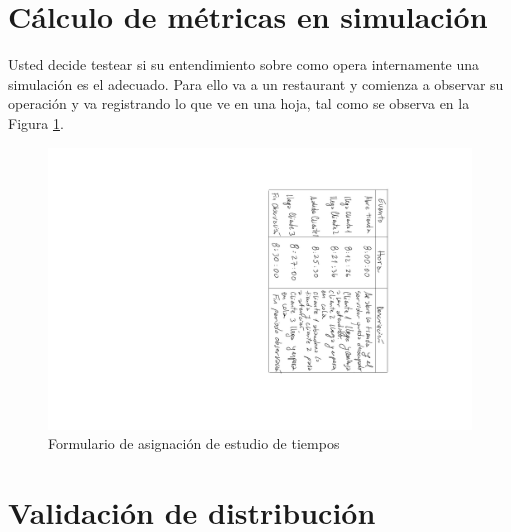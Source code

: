 \documentclass[11pt]{exam}
\begin{document}
\begin{questions}
\section*{C\'alculo de m\'etricas en simulaci\'on}
\question Usted decide testear si su entendimiento sobre como opera internamente una simulaci\'on es el adecuado. Para ello va a un restaurant y comienza a observar su operaci\'on y va registrando lo que ve en una hoja, tal como se observa en la Figura \ref{fig:esttiemp}.
\begin{figure}[htbp]
\centering
		\includegraphics[scale=0.7,keepaspectratio,trim={22cm 4cm 8.5cm 4cm},clip,angle =90]{dic1.png}
			\caption{Formulario de asignaci\'on de estudio de tiempos}
			\label{fig:esttiemp}
\end{figure}


\section*{Validaci\'on de distribuci\'on}


\end{questions}
\end{document}
